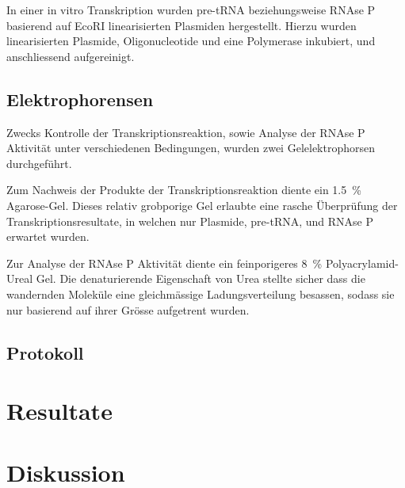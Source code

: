 \documentclass[a4paper,english]{scrreprt}
\begin{document}
In einer in vitro Transkription wurden pre-tRNA beziehungsweise RNAse P
basierend auf EcoRI linearisierten Plasmiden hergestellt. Hierzu wurden
linearisierten Plasmide, Oligonucleotide und eine Polymerase inkubiert, und
anschliessend aufgereinigt.

\section{Elektrophorensen}

Zwecks Kontrolle der Transkriptionsreaktion, sowie Analyse der RNAse P
Aktivität unter verschiedenen Bedingungen, wurden zwei Gelelektrophorsen
durchgeführt.

Zum Nachweis der Produkte der Transkriptionsreaktion diente ein
\SI{1.5}{\percent} Agarose-Gel. Dieses relativ grobporige Gel erlaubte eine
rasche Überprüfung der Transkriptionsresultate, in welchen nur Plasmide,
pre-tRNA, und RNAse P erwartet wurden.

Zur Analyse der RNAse P Aktivität diente ein feinporigeres \SI{8}{\percent}
Polyacrylamid-Ureal Gel. Die denaturierende Eigenschaft von Urea stellte sicher
dass die wandernden Moleküle eine gleichmässige Ladungsverteilung besassen,
sodass sie nur basierend auf ihrer Grösse aufgetrent wurden.

\section{Protokoll}



\chapter{Resultate}


\chapter{Diskussion}






\end{document}
